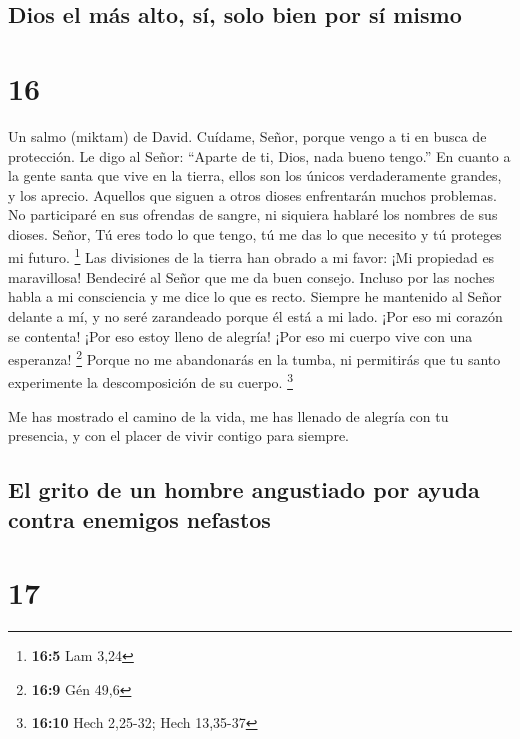 \hypertarget{dios-el-muxe1s-alto-suxed-solo-bien-por-suxed-mismo}{%
\subsection{Dios el más alto, sí, solo bien por sí
mismo}\label{dios-el-muxe1s-alto-suxed-solo-bien-por-suxed-mismo}}

\hypertarget{section-15}{%
\section{16}\label{section-15}}

Un salmo (miktam) de David.  Cuídame, Señor, porque vengo a
ti en busca de protección.  Le digo al Señor: ``Aparte de
ti, Dios, nada bueno tengo.''  En cuanto a la gente santa
que vive en la tierra, ellos son los únicos verdaderamente grandes, y
los aprecio.  Aquellos que siguen a otros dioses enfrentarán
muchos problemas. No participaré en sus ofrendas de sangre, ni siquiera
hablaré los nombres de sus dioses.  Señor, Tú eres todo lo
que tengo, tú me das lo que necesito y tú proteges mi futuro.
\footnote{\textbf{16:5} Lam 3,24}  Las divisiones de la
tierra han obrado a mi favor: ¡Mi propiedad es maravillosa! 
Bendeciré al Señor que me da buen consejo. Incluso por las noches habla
a mi consciencia y me dice lo que es recto.  Siempre he
mantenido al Señor delante a mí, y no seré zarandeado porque él está a
mi lado.  ¡Por eso mi corazón se contenta! ¡Por eso estoy
lleno de alegría! ¡Por eso mi cuerpo vive con una esperanza! \footnote{\textbf{16:9}
  Gén 49,6}  Porque no me abandonarás en la tumba, ni
permitirás que tu santo experimente la descomposición de su cuerpo.
\footnote{\textbf{16:10} Hech 2,25-32; Hech 13,35-37}

 Me has mostrado el camino de la vida, me has llenado de
alegría con tu presencia, y con el placer de vivir contigo para siempre.

\hypertarget{el-grito-de-un-hombre-angustiado-por-ayuda-contra-enemigos-nefastos}{%
\subsection{El grito de un hombre angustiado por ayuda contra enemigos
nefastos}\label{el-grito-de-un-hombre-angustiado-por-ayuda-contra-enemigos-nefastos}}

\hypertarget{section-16}{%
\section{17}\label{section-16}}

